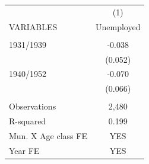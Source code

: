 \begin{tabular}{lc} \hline
 & (1) \\
VARIABLES & Unemployed \\ \hline
 &  \\
1931/1939 & -0.038 \\
 & (0.052) \\
1940/1952 & -0.070 \\
 & (0.066) \\
 &  \\
Observations & 2,480 \\
R-squared & 0.199 \\
Mun. X Age class FE & YES \\
 Year FE & YES \\ \hline
\end{tabular}
